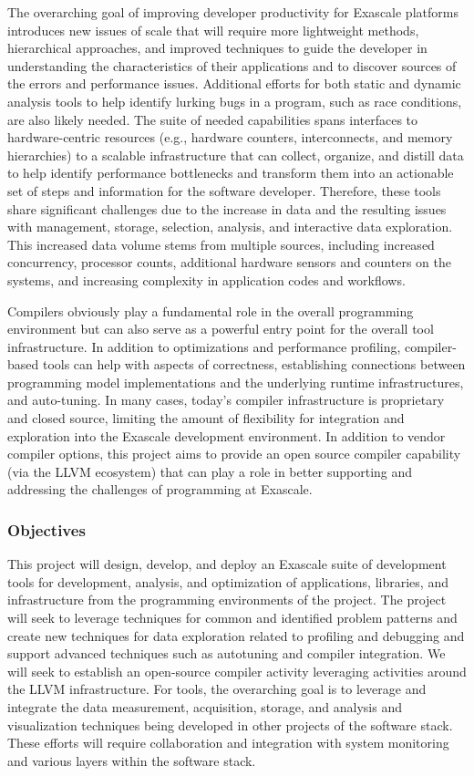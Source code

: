 The overarching goal of improving developer productivity for Exascale platforms introduces new issues of scale that will require more lightweight methods, hierarchical approaches, and improved techniques to guide the developer in understanding the characteristics of their applications and to discover sources of the errors and performance issues. Additional efforts for both static and dynamic analysis tools to help identify lurking bugs in a program, such as race conditions, are also likely needed. The suite of needed capabilities spans interfaces to hardware-centric resources (e.g., hardware counters, interconnects, and memory hierarchies) to a scalable infrastructure that can collect, organize, and distill data to help identify performance bottlenecks and transform them into an actionable set of steps and information for the software developer. Therefore, these tools share significant challenges due to the increase in data and the resulting issues with management, storage, selection, analysis, and interactive data exploration. This increased data volume stems from multiple sources, including increased concurrency, processor counts, additional hardware sensors and counters on the systems, and increasing complexity in application codes and workflows.

Compilers obviously play a fundamental role in the overall programming environment but can also serve as a powerful entry point for the overall tool infrastructure. In addition to optimizations and performance profiling, compiler-based tools can help with aspects of correctness, establishing connections between programming model implementations and the underlying runtime infrastructures, and auto-tuning. In many cases, today's compiler infrastructure is proprietary and closed source, limiting the amount of flexibility for integration and exploration into the Exascale development environment. In addition to vendor compiler options, this project aims to provide an open source compiler capability (via the LLVM ecosystem) that can play a role in better supporting and addressing the challenges of programming at Exascale. 


\subsubsection{Objectives}

This project will design, develop, and deploy an Exascale suite of development tools for development, analysis, and optimization of applications, libraries, and infrastructure from the programming environments of the project.  The project will seek to leverage techniques for common and identified problem patterns and create new techniques for data exploration related to profiling and debugging and support advanced techniques such as autotuning and compiler integration. We will seek to establish an open-source compiler activity leveraging activities around the LLVM infrastructure. For tools, the overarching goal is to leverage and integrate the data measurement, acquisition, storage, and analysis and visualization techniques being developed in other projects of the software stack.  These efforts will require collaboration and integration with system monitoring and various layers within the software stack.


